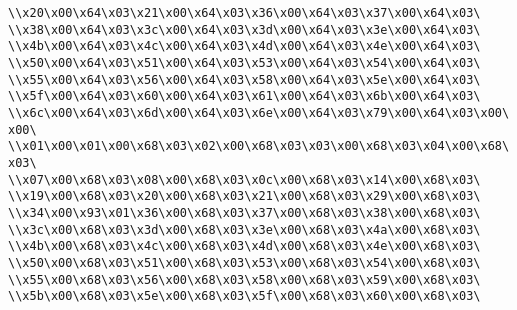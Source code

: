 \verb|\\x20\x00\x64\x03\x21\x00\x64\x03\x36\x00\x64\x03\x37\x00\x64\x03\|\newline
\verb|\\x38\x00\x64\x03\x3c\x00\x64\x03\x3d\x00\x64\x03\x3e\x00\x64\x03\|\newline
\verb|\\x4b\x00\x64\x03\x4c\x00\x64\x03\x4d\x00\x64\x03\x4e\x00\x64\x03\|\newline
\verb|\\x50\x00\x64\x03\x51\x00\x64\x03\x53\x00\x64\x03\x54\x00\x64\x03\|\newline
\verb|\\x55\x00\x64\x03\x56\x00\x64\x03\x58\x00\x64\x03\x5e\x00\x64\x03\|\newline
\verb|\\x5f\x00\x64\x03\x60\x00\x64\x03\x61\x00\x64\x03\x6b\x00\x64\x03\|\newline
\verb|\\x6c\x00\x64\x03\x6d\x00\x64\x03\x6e\x00\x64\x03\x79\x00\x64\x03\x00\x00\|\newline
\verb|\\x01\x00\x01\x00\x68\x03\x02\x00\x68\x03\x03\x00\x68\x03\x04\x00\x68\x03\|\newline
\verb|\\x07\x00\x68\x03\x08\x00\x68\x03\x0c\x00\x68\x03\x14\x00\x68\x03\|\newline
\verb|\\x19\x00\x68\x03\x20\x00\x68\x03\x21\x00\x68\x03\x29\x00\x68\x03\|\newline
\verb|\\x34\x00\x93\x01\x36\x00\x68\x03\x37\x00\x68\x03\x38\x00\x68\x03\|\newline
\verb|\\x3c\x00\x68\x03\x3d\x00\x68\x03\x3e\x00\x68\x03\x4a\x00\x68\x03\|\newline
\verb|\\x4b\x00\x68\x03\x4c\x00\x68\x03\x4d\x00\x68\x03\x4e\x00\x68\x03\|\newline
\verb|\\x50\x00\x68\x03\x51\x00\x68\x03\x53\x00\x68\x03\x54\x00\x68\x03\|\newline
\verb|\\x55\x00\x68\x03\x56\x00\x68\x03\x58\x00\x68\x03\x59\x00\x68\x03\|\newline
\verb|\\x5b\x00\x68\x03\x5e\x00\x68\x03\x5f\x00\x68\x03\x60\x00\x68\x03\|\newline
